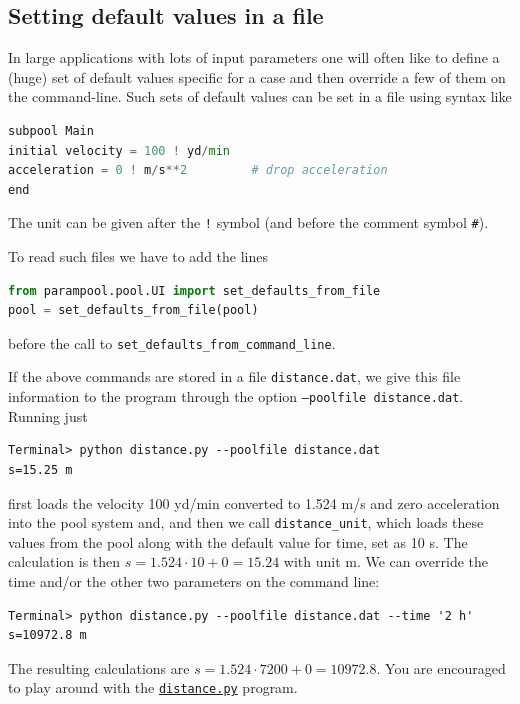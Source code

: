 \documentclass[graybox,envcountchap,sectrefs,final]{svmonodo}
\begin{document}
\subsection{Setting default values in a file}

In large applications with lots of input parameters one will often like
to define a (huge) set of default values specific for a case and then
override a few of them on the command-line. Such sets of default values
can be set in a file using syntax like

\begin{lstlisting}[language=Python,style=graycolor]
subpool Main
initial velocity = 100 ! yd/min
acceleration = 0 ! m/s**2         # drop acceleration
end
\end{lstlisting}
The unit can be given after the \Verb?!? symbol (and before the comment symbol \Verb!#!).

To read such files we have to add the lines

\begin{lstlisting}[language=Python,style=graycolor]
from parampool.pool.UI import set_defaults_from_file
pool = set_defaults_from_file(pool)
\end{lstlisting}
before the call to \Verb!set_defaults_from_command_line!.

If the above commands are stored in a file \texttt{distance.dat}, we give
this file information to the program through the
option \texttt{--poolfile distance.dat}. Running just

\begin{Verbatim}[frame=lines,label=\fbox{{\tiny Terminal}},framesep=2.5mm,framerule=0.7pt,fontsize=\fontsize{9pt}{9pt}]
Terminal> python distance.py --poolfile distance.dat
s=15.25 m
\end{Verbatim}
first loads the velocity
100 yd/min converted to 1.524 m/s and zero acceleration
into the pool system and, and then we call \Verb!distance_unit!, which
loads these values from the pool along with the default value for
time, set as 10 s. The calculation is then $s=1.524\cdot 10 + 0=15.24$
with unit m. We can override the time and/or the other two
parameters on the command line:

\begin{Verbatim}[frame=lines,label=\fbox{{\tiny Terminal}},framesep=2.5mm,framerule=0.7pt,fontsize=\fontsize{9pt}{9pt}]
Terminal> python distance.py --poolfile distance.dat --time '2 h'
s=10972.8 m
\end{Verbatim}
The resulting calculations are $s=1.524\cdot 7200 + 0 =10972.8$.
You are encouraged to play around with the \href{{http://tinyurl.com/o8pb3yy/distance.py}}{\nolinkurl{distance.py}} program.
\end{document}
